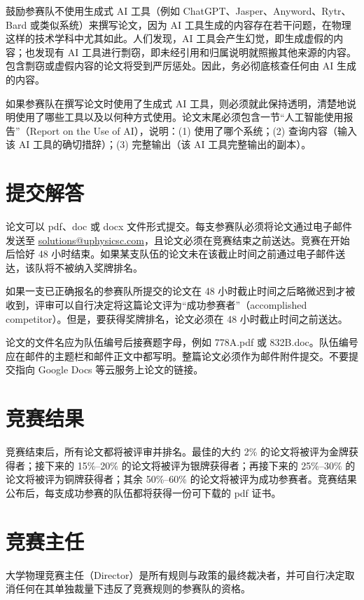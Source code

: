 \documentclass[11pt,a4paper]{ctexart}
\begin{document}
鼓励参赛队不使用生成式 AI 工具（例如 ChatGPT、Jasper、Anyword、Rytr、Bard 或类似系统）来撰写论文，因为
AI 工具生成的内容存在若干问题，在物理这样的技术学科中尤其如此。人们发现，AI
工具会产生幻觉，即生成虚假的内容；也发现有 AI 工具进行剽窃，即未经引用和归属说明就照搬其他来源的内容。包含剽窃或虚假内容的论文将受到严厉惩处。因此，务必彻底核查任何由
AI 生成的内容。

如果参赛队在撰写论文时使用了生成式 AI 工具，则必须就此保持透明，清楚地说明使用了哪些工具以及以何种方式使用。论文末尾必须包含一节“人工智能使用报告”（Report
on the Use of AI），说明：(1) 使用了哪个系统；(2) 查询内容（输入该 AI 工具的确切措辞）；(3)
完整输出（该 AI 工具完整输出的副本）。

\section{提交解答}

论文可以 pdf、doc 或 docx 文件形式提交。每支参赛队必须将论文通过电子邮件发送至
\href{mailto:solutions@uphysicsc.com}{\mbox{solutions@uphysicsc.com}}，且论文必须在竞赛结束之前送达。竞赛在开始后恰好
48 小时结束。如果某支队伍的论文未在该截止时间之前通过电子邮件送达，该队将不被纳入奖牌排名。

如果一支已正确报名的参赛队所提交的论文在 48 小时截止时间之后略微迟到才被收到，评审可以自行决定将这篇论文评为“成功参赛者”（accomplished
competitor）。但是，要获得奖牌排名，论文必须在 48 小时截止时间之前送达。

论文的文件名应为队伍编号后接赛题字母，例如 778A.pdf 或 832B.doc。队伍编号应在邮件的主题栏和邮件正文中都写明。整篇论文必须作为邮件附件提交。不要提交指向
Google Docs 等云服务上论文的链接。

\section{竞赛结果}

竞赛结束后，所有论文都将被评审并排名。最佳的大约 2\% 的论文将被评为金牌获得者；接下来的
15\%--20\% 的论文将被评为银牌获得者；再接下来的 25\%--30\% 的论文将被评为铜牌获得者；其余
50\%--60\% 的论文将被评为成功参赛者。竞赛结果公布后，每支成功参赛的队伍都将获得一份可下载的 pdf
证书。

\section{竞赛主任}

大学物理竞赛主任（Director）是所有规则与政策的最终裁决者，并可自行决定取消任何在其单独裁量下违反了竞赛规则的参赛队的资格。
\end{document}
